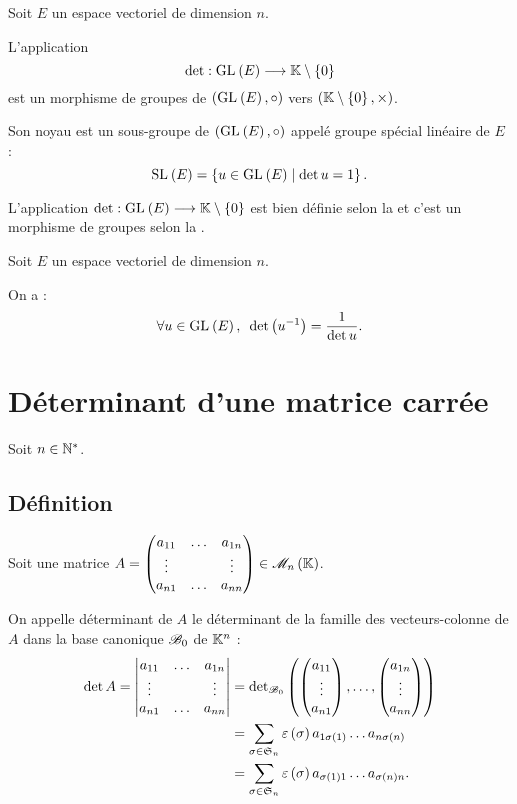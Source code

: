 \begin{defprop}
Soit \(E\) un espace vectoriel de dimension \(n\).

L'application \[\det:\GL{}[E]\to\K\excluant\accol{0}\] est un morphisme de groupes de \(\groupe{\GL{}[E]}[\rond]\) vers \(\groupe{\K\excluant\accol{0}}[\times]\).

Son noyau est un sous-groupe de \(\groupe{\GL{}[E]}[\rond]\) appelé groupe spécial linéaire de \(E\) : \[\SL{}[E]=\accol{u\in\GL{}[E]\tq\det u=1}.\]
\end{defprop}

\begin{dem}
L'application \(\det:\GL{}[E]\to\K\excluant\accol{0}\) est bien définie selon la  et c'est un morphisme de groupes selon la .
\end{dem}

\begin{cor}
Soit \(E\) un espace vectoriel de dimension \(n\).

On a : \[\quantifs{\forall u\in\GL{}[E]}\det\paren{u\inv}=\dfrac{1}{\det u}.\]
\end{cor}

\section{Déterminant d'une matrice carrée}

Soit \(n\in\mathbb{N}^*\).

\subsection{Définition}

\begin{defi}
Soit une matrice \(A=\begin{pmatrix}
a_{11} & \dots & a_{1n} \\
\vdots &  & \vdots \\
a_{n1} & \dots & a_{nn}
\end{pmatrix}\in\M{n}\).

On appelle déterminant de \(A\) le déterminant de la famille des vecteurs-colonne de \(A\) dans la base canonique \(\mathscr{B}_0\) de \(\mathbb{K}^n\) : \[\begin{aligned}
\det A=\begin{vmatrix}
a_{11} & \dots & a_{1n} \\
\vdots &  & \vdots \\
a_{n1} & \dots & a_{nn}
\end{vmatrix}&=\detb[\fami{B}_0]\paren{\tcoords{a_{11}}{\vdots}{a_{n1}},\dots,\tcoords{a_{1n}}{\vdots}{a_{nn}}} \\
&=\sum_{\sigma\in\S{n}}\epsilon\paren{\sigma}a_{1\sigma\paren{1}}\dots a_{n\sigma\paren{n}} \\
&=\sum_{\sigma\in\S{n}}\epsilon\paren{\sigma}a_{\sigma\paren{1}1}\dots a_{\sigma\paren{n}n}.
\end{aligned}\]
\end{defi}

